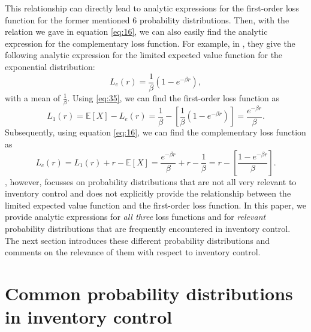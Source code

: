 \documentclass{article}
\begin{document}
\begin{flushleft}
\begin{equation}
    \end{equation}
    This relationship can directly lead to analytic expressions for the first-order loss function for the former mentioned $6$ probability distributions.
    Then, with the relation we gave in equation \ref{eq:16}, we can also easily find the analytic expression for the complementary loss function.
    For example, in \cite{Burnecki2005}, they give the following analytic expression for the limited expected value function for the exponential distribution:
    \begin{equation*}
        L_e(r) = \frac{1}{\beta}(1-e^{-\beta r}),
    \end{equation*}
    with a mean of $\frac{1}{\beta}$.
    Using \ref{eq:35}, we can find the first-order loss function as
    \begin{equation*}
        L_1(r) = \mathbb{E}[X] - L_e(r) = \frac{1}{\beta}-\left[\frac{1}{\beta}(1-e^{-\beta r})\right] = \frac{e^{-\beta r}}{\beta}.
    \end{equation*}
    Subsequently, using equation \ref{eq:16}, we can find the complementary loss function as
    \begin{equation*}
        L_c(r) = L_1(r) + r - \mathbb{E}[X] = \frac{e^{-\beta r}}{\beta} + r - \frac{1}{\beta} = r-\left[\frac{1-e^{-\beta r}}{\beta}\right].
    \end{equation*}
    \cite{Burnecki2005}, however, focusses on probability distributions that are not all very relevant to inventory control and does not explicitly provide the relationship between the limited expected value function and the first-order loss function.
    In this paper, we provide analytic expressions for \textit{all three} loss functions and for \textit{relevant} probability distributions that are frequently encountered in inventory control.
    The next section introduces these different probability distributions and comments on the relevance of them with respect to inventory control.
\end{flushleft}
\section{Common probability distributions in inventory control}
\end{document}
